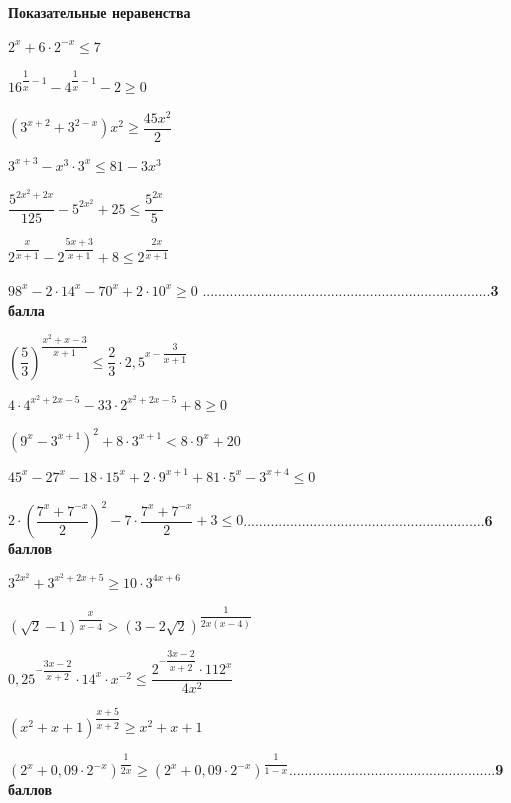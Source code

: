 \centerline{\bf \Huge Показательные неравенства}



 $2^x+6 \cdot 2^{-x} \leqslant 7$

 $16^{\dfrac{1}{x}-1}-4^{\dfrac{1}{x}-1}-2 \geqslant 0$

 $\left(3^{x+2}+3^{2-x}\right) x^2 \geqslant \dfrac{45 x^2}{2}$

 $3^{x+3}-x^3 \cdot 3^x \leqslant 81-3 x^3$

 $\dfrac{5^{2 x^2+2 x}}{125}-5^{2 x^2}+25 \leqslant \dfrac{5^{2 x}}{5}$

 $2^{\dfrac{x}{x+1}}-2^{\dfrac{5 x+3}{x+1}}+8 \leqslant 2^{\dfrac{2 x}{x+1}}$

 $98^x-2 \cdot 14^x-70^x+2 \cdot 10^x \geqslant 0$ ..........................................................................\textbf{3 балла}

 $\left(\dfrac{5}{3}\right)^{\dfrac{x^2+x-3}{x+1}} \leqslant \dfrac{2}{3} \cdot 2,5^{x-\dfrac{3}{x+1}}$

 $4 \cdot 4^{x^2+2 x-5}-33 \cdot 2^{x^2+2 x-5}+8 \geqslant 0$

 $\left(9^x-3^{x+1}\right)^2+8 \cdot 3^{x+1}<8 \cdot 9^x+20$

 $45^x-27^x-18 \cdot 15^x+2 \cdot 9^{x+1}+81 \cdot 5^x-3^{x+4} \leqslant 0$

 $2 \cdot\left(\dfrac{7^x+7^{-x}}{2}\right)^2-7 \cdot \dfrac{7^x+7^{-x}}{2}+3 \leqslant 0$..............................................................\textbf{6 баллов}


 $3^{2 x^2}+3^{x^2+2 x+5} \geqslant 10 \cdot 3^{4 x+6}$

 $(\sqrt{2}-1)^{\dfrac{x}{x-4}}>(3-2 \sqrt{2})^{\dfrac{1}{2 x(x-4)}}$


 $0,25^{-\dfrac{3 x-2}{x+2}} \cdot 14^x \cdot x^{-2} \leqslant \dfrac{2^{-\dfrac{3 x-2}{x+2}} \cdot 112^x}{4 x^2}$



 $\left(x^2+x+1\right)^{\dfrac{x+5}{x+2}} \geqslant x^2+x+1$

 $\left(2^x+0,09 \cdot 2^{-x}\right)^{\dfrac{1}{2 x}} \geqslant\left(2^x+0,09 \cdot 2^{-x}\right)^{\dfrac{1}{1-x}}$.....................................................\textbf{9 баллов}
